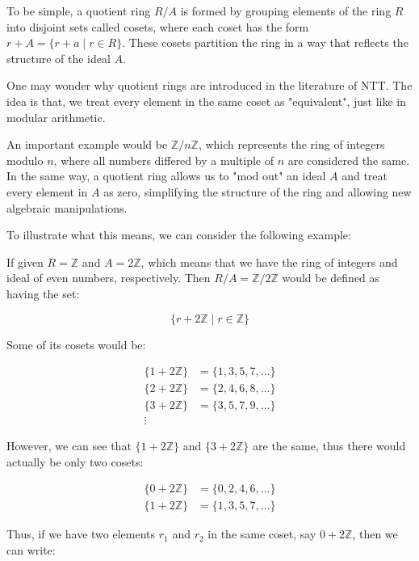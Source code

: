 \documentclass[12pt]{article}
\begin{document}
To be simple, 
a quotient ring $R/A$ is formed by grouping elements of the ring $R$ into disjoint sets called cosets, 
where each coset has the form $r + A = \{r + a \mid r \in R\}$. 
These cosets partition the ring in a way that reflects the structure of the ideal $A$.

One may wonder why quotient rings are introduced in the literature of NTT.
The idea is that, we treat every element in the same coset as "equivalent", just like in modular arithmetic. 

An important example would be $\mathbb{Z}/n\mathbb{Z}$, which represents the ring of integers modulo $n$, 
where all numbers differed by a multiple of $n$ are considered the same. 
In the same way, a quotient ring allows us to "mod out" an ideal $A$ and treat every element in $A$ as zero, simplifying the structure of the ring and allowing new algebraic manipulations.

To illustrate what this means, 
we can consider the following example:

If given $R = \mathbb{Z}$ and $A = 2\mathbb{Z}$, 
which means that we have the ring of integers and ideal of even numbers, respectively.
Then $R/A = \mathbb{Z}/2\mathbb{Z}$ would be defined as having the set:

\begin{equation*}
    \{r + 2\mathbb{Z} \mid r \in \mathbb{Z}\}
\end{equation*}

Some of its cosets would be:

\begin{align*}
    \{1 + 2\mathbb{Z}\} &= \{1, 3, 5, 7, \ldots\} \\
    \{2 + 2\mathbb{Z}\} &= \{2, 4, 6, 8, \ldots\} \\
    \{3 + 2\mathbb{Z}\} &= \{3, 5, 7, 9, \ldots\} \\
    \vdots
\end{align*}

However, we can see that $\{1 + 2\mathbb{Z}\}$ and $\{3 + 2\mathbb{Z}\}$ are the same, 
thus there would actually be only two cosets:

\begin{align*}
    \{0 + 2\mathbb{Z}\} &= \{0, 2, 4, 6, \ldots\} \\
    \{1 + 2\mathbb{Z}\} &= \{1, 3, 5, 7, \ldots\} 
\end{align*}

Thus, if we have two elements $r_1$ and $r_2$ in the same coset, say $0 + 2\mathbb{Z}$, 
then we can write:
\end{document}
